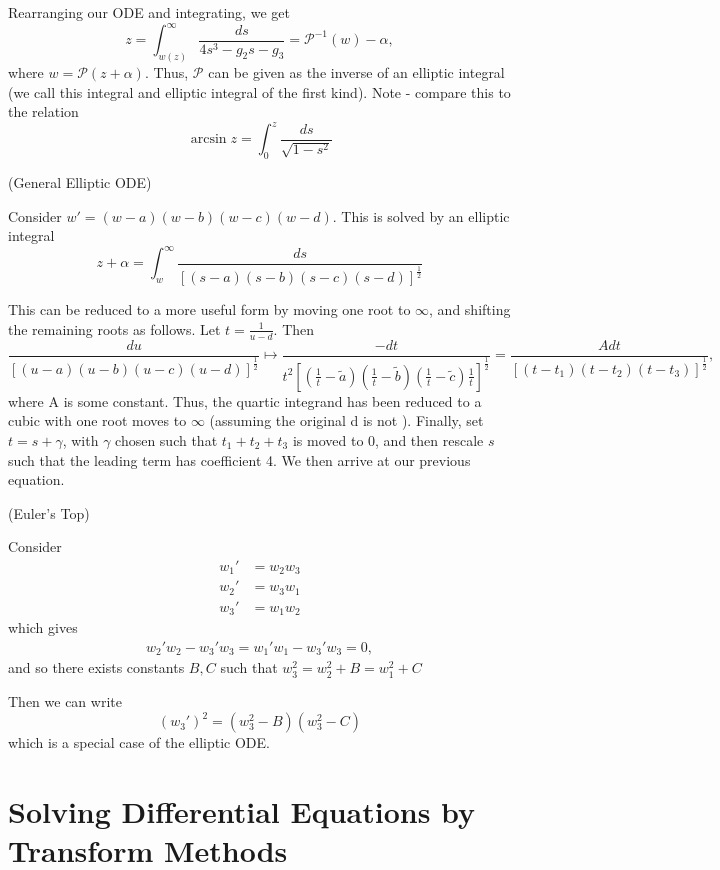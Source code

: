\documentclass[a4paper]{article}
\begin{document}
Rearranging our ODE and integrating, we get
 \[
	 z = \int_{w(z)}^{\infty} \frac{ds}{4s^3 - g_2s - g_3} = \mathcal{P}^{-1}(w) - \alpha
 ,\] where $w = \mathcal{P}(z+\alpha)$. Thus,  $\mathcal{P}$ can be given as the  inverse of an elliptic integral (we call this integral and elliptic integral of the first kind). Note - compare this to the relation
 \[
 \arcsin z = \int_{0}^{z} \frac{ds}{\sqrt{1-s^2}}
 \] 

\begin{eg} (General Elliptic ODE)
	
	Consider $w' = (w-a)(w-b)(w-c)(w-d)$. This is solved by an elliptic integral
	\[
		z + \alpha = \int_{w}^{\infty} \frac{ds}{\left[ (s-a)(s-b)(s-c)(s-d) \right]^{\frac{1}{2}} }
	\] 

	This can be reduced to a more useful form by moving one root to $\infty$, and shifting the remaining roots as follows. Let $t= \frac{1}{u-d}$. Then
	\[
		\frac{du}{\left[ (u-a)(u-b)(u-c)(u-d) \right]^{\frac{1}{2}} } \mapsto \frac{-dt}{t^2 \left[ (\frac{1}{t} - \tilde{a})(\frac{1}{t} - \tilde{b})(\frac{1}{t} - \tilde{c})\frac{1}{t} \right]^{\frac{1}{2}} } = \frac{Adt}{\left[ (t-t_1)(t-t_2)(t-t_3) \right]^{\frac{1}{2}} }
	,\] 
	where A is some constant. Thus, the quartic integrand has been reduced to a cubic with one root moves to $\infty$ (assuming the original d is not \infty). Finally, set $t = s + \gamma$, with $\gamma$ chosen such that  $t_1 + t_2 + t_3$ is moved to 0, and then rescale $s$ such that the leading term has coefficient 4. We then arrive at our previous equation.
\end{eg}

\begin{eg} (Euler's Top)

	Consider
	\begin{align*}
		w_1' &= w_2w_3 \\
		w_2' &= w_3w_1 \\
		w_3' &= w_1w_2
	\end{align*}
	which gives 
	\begin{align*}
		w_2'w_2 - w_3'w_3 = w_1'w_1 - w_3'w_3 = 0
	,\end{align*} and so there exists constants $B, C$ such that $w_3^{2} = w_2^2 + B = w_1^2 + C$
	
	Then we can write
	\[
		(w_3')^2 = (w_3^2 - B)(w_3^2 - C)
	\] which is a special case of the elliptic ODE. 
\end{eg}

\section{Solving Differential Equations by Transform Methods}
\end{document}
